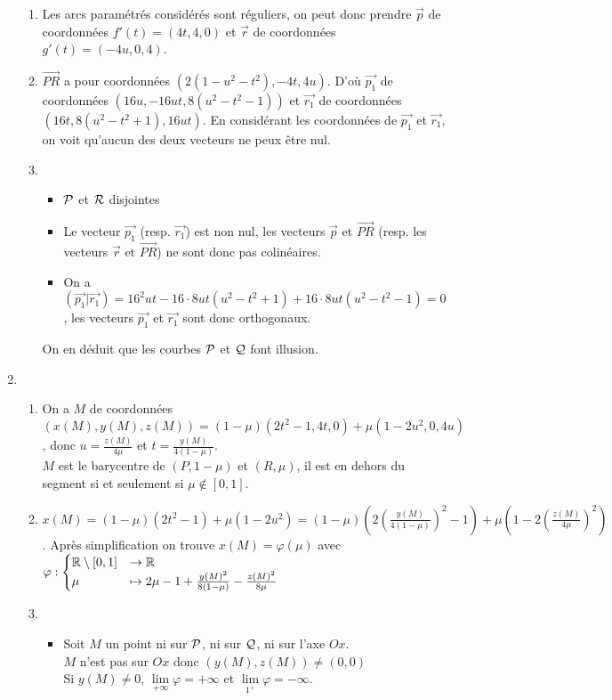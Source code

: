 \begin{enumerate}
\begin{enumerate}
\item Les arcs paramétrés considérés sont réguliers, on peut donc prendre $\vec{p}$ de coordonnées $f'(t)=(4t,4,0)$ et  $\vec{r}$ de coordonnées $g'(t)=(-4u,0,4)$.
\item $\overrightarrow{PR}$ a pour coordonnées $(2(1-u^2-t^2), -4t,4u)$. D'où $\vec{p_1}$ de coordonnées $(16u,-16ut,8(u^2-t^2-1))$ et  $\vec{r_1}$ de coordonnées $(16t,8(u^2-t^2+1),16ut)$. En considérant les coordonnées de $\vec{p_1}$ et $\vec{r_1}$, on voit qu'aucun des deux vecteurs ne peux être nul.
\item
\begin{itemize}
\item $\cal P$ et $\cal R$ disjointes
\item Le vecteur $\vec{p_1}$ (resp. $\vec{r_1}$) est non nul, les vecteurs $\vec{p}$ et $\overrightarrow{PR}$ (resp. les vecteurs $\vec{r}$ et $\overrightarrow{PR}$) ne sont donc pas colinéaires.
\item On a $(\vec{p_1}|\vec{r_1})=16^2ut-16\cdot 8ut(u^2-t^2+1)+16\cdot8ut(u^2-t^2-1)=0$, les vecteurs $\vec{p_1}$ et $\vec{r_1}$ sont donc orthogonaux.
\end{itemize}
On en déduit que les courbes $\cal P$ et $\cal Q$ font illusion.
\end{enumerate}
\item 
\begin{enumerate}
\item On a $M$ de coordonnées $(x(M),y(M),z(M))=(1-\mu)(2t^2-1, 4t,0)+\mu(1-2u^2,0,4u)$, donc $u=\frac{z(M)}{4\mu}$ et $t=\frac{y(M)}{4(1-\mu)}$.\\
$M$ est le barycentre de $(P, 1-\mu)$ et $(R,\mu)$, il est en dehors du segment si et seulement si $\mu\notin[0,1]$.
\item $x(M)=(1-\mu)(2t^2-1)+\mu(1-2u^2)=(1-\mu)\left(2\left(\frac {y(M)}{4(1-\mu)}\right)^2-1\right)+\mu\left(1-2\left(\frac {z(M)}{4\mu}\right)^2\right)$. Après simplification on trouve 
$x(M)=\varphi(\mu)$ avec $\varphi : \begin{cases}\mathbb{R}\setminus{[0,1]} &\rightarrow \mathbb{R} \\ \mu &\mapsto 2\mu-1+\frac{y(M)^2}{8(1-\mu)}-\frac{z(M)^2}{8\mu} \end{cases}$
\item \begin{itemize}
\item Soit $M$ un point ni sur $\cal P$, ni sur $\cal Q$, ni sur l'axe $Ox$.\\
$M$ n'est pas sur $Ox$ donc $(y(M), z(M))\neq (0,0)$\\
Si $y(M)\neq 0$, $\lim\limits_{+\infty}\varphi=+\infty$ et $\lim\limits_{1^+}\varphi=-\infty$.\\

\end{itemize}
\end{enumerate}
\end{enumerate}
